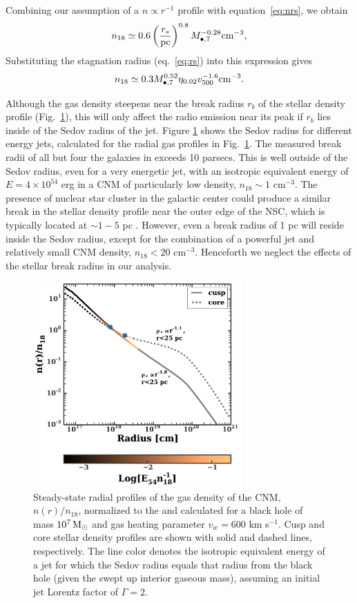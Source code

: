 \documentclass[usenatbib,fleqn]{mnras}
\newcommand{\Mbh}[1][]{M_{\bullet#1}}
\newcommand{\Msun}{{\rm M_\odot}}
\begin{document}
Combining our assumption of a $n\propto r^{-1}$ profile with equation~\eqref{eq:nrs}, we
obtain
\begin{equation}
  n_{18}\simeq 0.6 \left(\frac{r_s}{\rm pc}\right)^{0.8}
  \Mbh[,7]^{-0.28} {\rm cm^{-3}},
  \label{eq:n18}
\end{equation}
Substituting the stagnation radius (eq.~\ref{eq:rs}) into this expression gives
\begin{equation}
n_{18}\simeq 0.3 \Mbh[,7]^{0.52} \eta_{0.02} v_{500}^{-1.6} {\rm
  cm^{-3}}.
\label{eq:n182}
\end{equation} 

Although the gas density steepens near the break radius $r_b$ of the stellar density profile (Fig.~\ref{fig:profiles}), this will only affect the radio emission near its peak if $r_b$ lies inside of the Sedov radius of the jet.  Figure \ref{fig:profiles} shows the Sedov radius for different energy jets, calculated for the radial gas profiles in Fig.~\ref{fig:profiles}.  The measured break radii of all but four the galaxies in \citet{Lauer+2007} exceeds 10 parsecs.  This is well outside of the Sedov radius, even for a very energetic jet, with an isotropic equivalent energy of $E=4\times 10^{54}$ erg in a CNM of particularly low density, $n_{18} \sim 1$ cm$^{-3}$.  The presence of nuclear star cluster in the galactic center could produce a similar break in the stellar density profile near the outer edge of the NSC, which is typically located at $\sim 1-5$ pc \citep{Georgiev+2014}.   However, even a break radius of 1 pc will reside inside the Sedov radius, except for  the combination of a powerful jet and relatively small CNM density, $n_{18}<20$ cm$^{-3}$.  Henceforth we neglect the effects of the stellar break radius in our analysis.


\begin{figure}
\includegraphics[width=8cm]{sedov_radius.pdf}
\caption{\label{fig:profiles} Steady-state radial profiles of the gas density of the CNM, $n(r)/n_{18}$, normalized to the and calculated for a black hole of mass $10^{7} \,\Msun$ and gas heating parameter $v_w=600$ km s$^{-1}$.  Cusp and core stellar density profiles are shown with solid and dashed lines, respectively.  The line color denotes the isotropic equivalent energy of a jet for which the Sedov radius equals that radius from the black hole (given the swept up interior gaseous mass), assuming an initial jet Lorentz factor of $\Gamma=2$.}
\end{figure}
\end{document}
